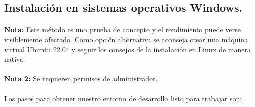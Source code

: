 \subsection{Instalación en sistemas operativos Windows.}

\paragraph{}\textbf{Nota:} Este método es una prueba de concepto y el rendimiento puede
verse visiblemente afectado. Como opción alternativa se aconseja crear una máquina
virtual Ubuntu 22.04 y seguir los consejos de la instalación en Linux de manera nativa.

\paragraph{}\textbf{Nota 2:} Se requieren permisos de administrador.

\paragraph{}Los pasos para obtener nuestro entorno de desarrollo listo para trabajar son:

